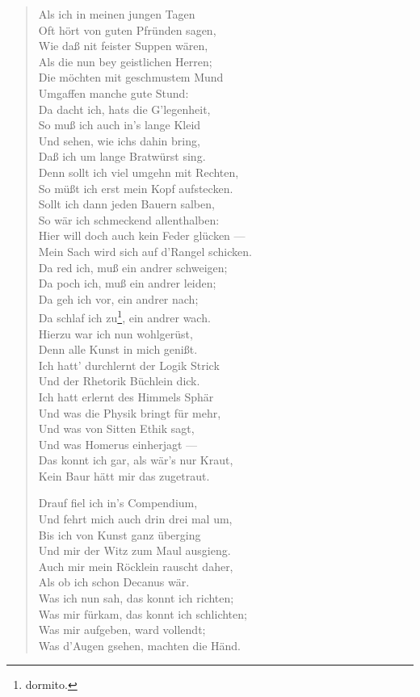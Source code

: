 \begin{verse}
Als ich in meinen jungen Tagen\\
Oft hört von guten Pfründen sagen,\\
Wie daß nit feister Suppen wären,\\
Als die nun bey geistlichen Herren;\\
Die möchten mit geschmustem Mund\\
Umgaffen manche gute Stund:\\
Da dacht ich, hats die G’legenheit,\\
So muß ich auch in’s lange Kleid\\
Und sehen, wie ichs dahin bring,\\
Daß ich um lange Bratwürst sing.\\
Denn sollt ich viel umgehn mit Rechten,\\
So müßt ich erst mein Kopf aufstecken.\\
Sollt ich dann jeden Bauern salben,\\
So wär ich schmeckend allenthalben:\\
Hier will doch auch kein Feder glücken —\\
Mein Sach wird sich auf d’Rangel schicken.\\
Da red ich, muß ein andrer schweigen;\\
Da poch ich, muß ein andrer leiden;\\
Da geh ich vor, ein andrer nach;\\
Da schlaf ich zu\footnote{dormito.}, ein andrer wach.\\
Hierzu war ich nun wohlgerüst,\\
Denn alle Kunst in mich genißt.\\
Ich hatt’ durchlernt der Logik Strick\\
Und der Rhetorik Büchlein dick.\\
Ich hatt erlernt des Himmels Sphär\\
Und was die Physik bringt für mehr,\\
Und was von Sitten Ethik sagt,\\
Und was Homerus einherjagt —\\
Das konnt ich gar, als wär’s nur Kraut,\\
Kein Baur hätt mir das zugetraut.

Drauf fiel ich in’s Compendium,\\
Und fehrt mich auch drin drei mal um,\\
Bis ich von Kunst ganz überging\\
Und mir der Witz zum Maul ausgieng.\\
Auch mir mein Röcklein rauscht daher,\\
Als ob ich schon Decanus wär.\\
Was ich nun sah, das konnt ich richten;\\
Was mir fürkam, das konnt ich schlichten;\\
Was mir aufgeben, ward vollendt;\\
Was d’Augen gsehen, machten die Händ.


\end{verse}
